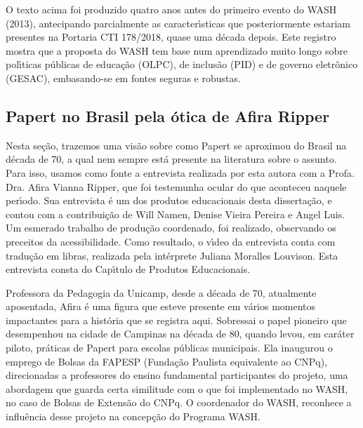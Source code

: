 \documentclass[
12pt,		%
openright,	%
twoside,  %
a4paper,			%
chapter=TITLE,		%
english,			%
french,				%
spanish,			%
brazil				%
]{USPSC-classe/USPSC}
\begin{document}
O texto acima foi produzido quatro anos antes do primeiro evento do WASH (2013), antecipando parcialmente as caracter\'{\i}sticas que posteriormente estariam presentes na Portaria CTI 178/2018, quase uma d\'ecada depois. Este registro mostra que a proposta do WASH tem base num aprendizado muito longo sobre pol\'{\i}ticas p\'ublicas de educa\c{c}\~ao (OLPC), de inclus\~ao (PID) e de governo eletr\^onico (GESAC), embasando-se em fontes seguras e robustas.









\subsection[Papert no Brasil pela \'otica de Afira Ripper]{Papert no Brasil pela \'otica de Afira Ripper}\label{Papert no Brasil pela \'otica de Afira Ripper}
Nesta se\c{c}\~ao, trazemos uma vis\~ao sobre como Papert se aproximou do Brasil na d\'ecada de 70, a qual nem sempre est\'a presente na literatura sobre o assunto. Para isso, usamos como fonte a entrevista realizada por esta autora com a Profa. Dra. Afira Vianna Ripper, que foi testemunha ocular do que aconteceu naquele per\'{\i}odo. Sua entrevista \'e um dos produtos educacionais desta disserta\c{c}\~ao, e contou com a contribui\c{c}\~ao de Will Namen, Denise Vieira Pereira e Angel Luis. Um esmerado trabalho de produ\c{c}\~ao coordenado, foi realizado, observando os preceitos da acessibilidade. Como resultado, o v\'{\i}deo da entrevista conta com tradu\c{c}\~ao em libras, realizada pela int\'erprete Juliana Moralles Louvison. Esta entrevista consta do Cap\'{\i}tulo de Produtos Educacionais.









Professora da Pedagogia da Unicamp, desde a d\'ecada de 70, atualmente aposentada, Afira \'e uma figura que esteve presente em v\'arios momentos impactantes para a hist\'oria que se registra aqui. Sobressai o papel pioneiro que  desempenhou na cidade de Campinas na d\'ecada de 80, quando levou, em car\'ater piloto, pr\'aticas de Papert para escolas p\'ublicas municipais. Ela inaugurou o emprego de Bolsas da FAPESP (Funda\c{c}\~ao Paulista equivalente ao CNPq), direcionadas a professores do ensino fundamental participantes do projeto, uma abordagem que guarda certa similitude com o que foi implementado no WASH, no caso de Bolsas de Extens\~ao do CNPq. O coordenador do WASH, reconhece a influ\^encia desse projeto na concep\c{c}\~ao do Programa WASH.
\end{document}
